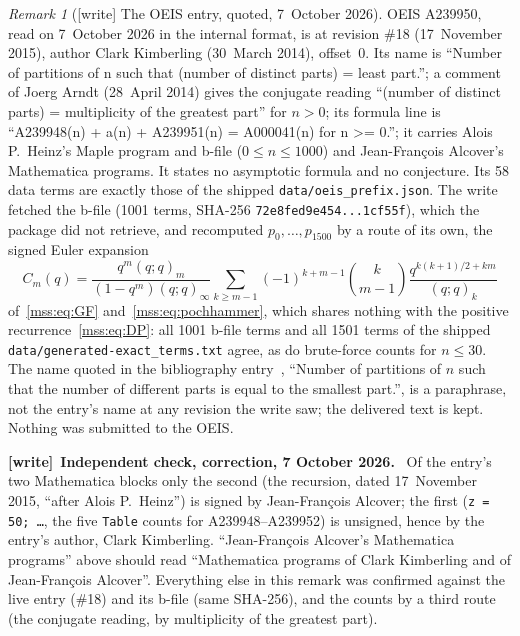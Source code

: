 \documentclass[11pt,letterpaper]{article}
\numberwithin{equation}{section}
\theoremstyle{definition}\newtheorem{definition}[theorem]{Definition}
\theoremstyle{remark}\newtheorem{remark}[theorem]{Remark}
\newcommand{\file}[1]{\nolinkurl{#1}}
\newenvironment{writenote}[1][]{\par\smallskip\begingroup\small
 \noindent\textbf{[write]}\if\relax\detokenize{#1}\relax\else~\textbf{#1.}\fi\ }%
 {\par\endgroup\smallskip}
\begin{document}
\begin{remark}[{[write]} The OEIS entry, quoted, 7~October 2026]\label{mss:rem:oeis}
OEIS A239950, read on 7~October 2026 in the internal format, is at revision
\#18 (17~November 2015), author Clark Kimberling (30~March 2014), offset~0.
Its name is ``Number of partitions of n such that (number of distinct parts)
= least part.''; a comment of Joerg Arndt (28~April 2014) gives the
conjugate reading ``(number of distinct parts) = multiplicity of the greatest
part'' for $n>0$; its formula line is ``A239948(n) + a(n) + A239951(n) =
A000041(n) for n >= 0.''; it carries Alois P.~Heinz's Maple program and
b-file ($0\le n\le1000$) and Jean-Fran\c{c}ois Alcover's Mathematica
programs. It states no asymptotic formula and no conjecture. Its 58 data
terms are exactly those of the shipped \file{data/oeis_prefix.json}. The
write fetched the b-file (1001 terms, SHA-256 \file{72e8fed9e454...1cf55f}),
which the package did not retrieve, and recomputed $p_0,\dots,p_{1500}$ by a
route of its own, the signed Euler expansion
\[
C_m(q)=\frac{q^m(q;q)_m}{(1-q^m)(q;q)_\infty}
\sum_{k\ge m-1}(-1)^{k+m-1}\binom k{m-1}\frac{q^{k(k+1)/2+km}}{(q;q)_k}
\]
of~\eqref{mss:eq:GF} and~\eqref{mss:eq:pochhammer}, which shares nothing with
the positive recurrence~\eqref{mss:eq:DP}: all 1001 b-file terms and all 1501
terms of the shipped \file{data/generated-exact_terms.txt} agree, as do
brute-force counts for $n\le30$. The name quoted in the bibliography
entry~\cite{oeis}, ``Number of partitions of $n$ such that the number of
different parts is equal to the smallest part.'', is a paraphrase, not the
entry's name at any revision the write saw; the delivered text is kept.
Nothing was submitted to the OEIS.
\end{remark}
\begin{writenote}[Independent check, correction, 7 October 2026]
Of the entry's two Mathematica blocks only the second (the recursion, dated
17~November 2015, ``after Alois P.~Heinz'') is signed by Jean-Fran\c{c}ois
Alcover; the first (\texttt{z = 50; \dots}, the five \texttt{Table} counts
for A239948--A239952) is unsigned, hence by the entry's author, Clark
Kimberling. ``Jean-Fran\c{c}ois Alcover's Mathematica programs'' above
should read ``Mathematica programs of Clark Kimberling and of
Jean-Fran\c{c}ois Alcover''. Everything else in this remark was confirmed
against the live entry (\#18) and its b-file (same SHA-256), and the counts
by a third route (the conjugate reading, by multiplicity of the greatest
part).
\end{writenote}
\end{document}
